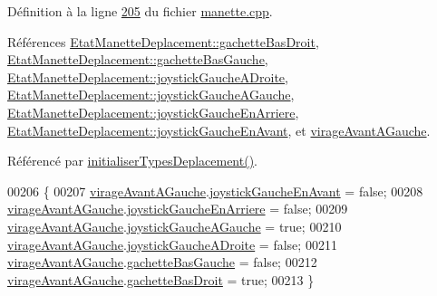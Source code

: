 Définition à la ligne \hyperlink{manette_8cpp_source_l00205}{205} du fichier \hyperlink{manette_8cpp_source}{manette.\+cpp}.



Références \hyperlink{manette_8h_source_l00185}{Etat\+Manette\+Deplacement\+::gachette\+Bas\+Droit}, \hyperlink{manette_8h_source_l00184}{Etat\+Manette\+Deplacement\+::gachette\+Bas\+Gauche}, \hyperlink{manette_8h_source_l00183}{Etat\+Manette\+Deplacement\+::joystick\+Gauche\+A\+Droite}, \hyperlink{manette_8h_source_l00182}{Etat\+Manette\+Deplacement\+::joystick\+Gauche\+A\+Gauche}, \hyperlink{manette_8h_source_l00181}{Etat\+Manette\+Deplacement\+::joystick\+Gauche\+En\+Arriere}, \hyperlink{manette_8h_source_l00180}{Etat\+Manette\+Deplacement\+::joystick\+Gauche\+En\+Avant}, et \hyperlink{manette_8h_source_l00233}{virage\+Avant\+A\+Gauche}.



Référencé par \hyperlink{manette_8cpp_source_l00085}{initialiser\+Types\+Deplacement()}.


\begin{DoxyCode}
00206 \{
00207     \hyperlink{class_manette_a3f44a6304ed3b17176636bad8f2220db}{virageAvantAGauche}.\hyperlink{struct_etat_manette_deplacement_a8c8e3ca694408bc6a6ced4e20b9da0be}{joystickGaucheEnAvant} = \textcolor{keyword}{false};
00208     \hyperlink{class_manette_a3f44a6304ed3b17176636bad8f2220db}{virageAvantAGauche}.\hyperlink{struct_etat_manette_deplacement_a584cf1538425c87588c5b96b79c8d482}{joystickGaucheEnArriere} = \textcolor{keyword}{false};
00209     \hyperlink{class_manette_a3f44a6304ed3b17176636bad8f2220db}{virageAvantAGauche}.\hyperlink{struct_etat_manette_deplacement_af7e92a8d8f116e2bc4a5a95386f604e7}{joystickGaucheAGauche} = \textcolor{keyword}{true};
00210     \hyperlink{class_manette_a3f44a6304ed3b17176636bad8f2220db}{virageAvantAGauche}.\hyperlink{struct_etat_manette_deplacement_a8fa93da5af430ac00ffd4ee8b76987a2}{joystickGaucheADroite} = \textcolor{keyword}{false};
00211     \hyperlink{class_manette_a3f44a6304ed3b17176636bad8f2220db}{virageAvantAGauche}.\hyperlink{struct_etat_manette_deplacement_a0d197e25bc2e0402a068a8d012c25472}{gachetteBasGauche} = \textcolor{keyword}{false};
00212     \hyperlink{class_manette_a3f44a6304ed3b17176636bad8f2220db}{virageAvantAGauche}.\hyperlink{struct_etat_manette_deplacement_a4588620c1e2a3543ce67c9a791aac106}{gachetteBasDroit} = \textcolor{keyword}{true};
00213 \}
\end{DoxyCode}
\mbox{\label{class_manette_a21ebb19837250342e4859ba7dc5f03cc}} 
